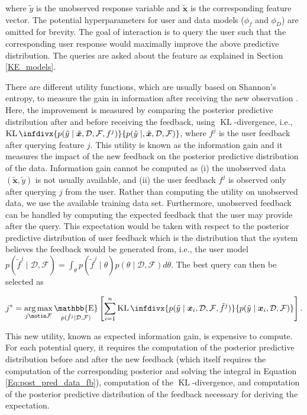 \documentclass[dissertation,math,vertlayout,pdfa,colorlinks]{aaltoseries}
\newcommand{\bD}{\mathcal{D}}
\newcommand{\bF}{\mathcal{F}}
\DeclareMathOperator{\KLt}{KL}
\newcommand{\KL}{\KLt\infdivx}
\DeclareMathOperator{\E}{\mathbb{E}}
\DeclareMathOperator*{\argmax}{arg\,max}
\begin{document}
\noindent where $\tilde{y}$ is the unobserved response variable and  $\tilde{\bm{x}}$ is the corresponding feature vector. %
The potential hyperparameters for user and data models ($\phi_f$ and $\phi_D$) are omitted for brevity. The goal of interaction is to query the user such that the corresponding user response would maximally improve the above predictive distribution. The queries are asked about the feature as explained in Section \ref{KE_models}. %


There are different utility functions, which are usually based on Shannon's entropy, to measure the gain in information after receiving the new observation \cite{MacKayOSD}. Here, the improvement is measured by comparing the posterior predictive distribution after and before receiving the feedback, using $\KLt$-divergence, i.e., $\KL{p(\tilde{y} \mid \tilde{\bm{x}}, \bD,\bF,f^{j})} {p(\tilde{y} \mid, \tilde{\bm{x}}, \bD,\bF)}$, where $f^{j}$ is the user feedback after querying feature $j$. This utility is known as the information gain and it measures the impact of the new feedback on the posterior predictive distribution of the data. Information gain cannot be computed as (i) the unobserved data $(\tilde{\bm{x}},\tilde{y})$ is not usually available, and (ii) the user feedback $f^{j}$ is observed only after querying $j$ from the user. Rather than computing the utility on unobserved data, we use the available training data set. Furthermore, unobserved feedback can be handled by computing the expected feedback that the user may provide after the query. This expectation would be taken with respect to the posterior predictive distribution of user feedback which is the distribution that the system believes the feedback would be generated from, i.e., the user model $p(\tilde{f}^j \mid \bD,\bF)= \int_{\theta} p(\tilde{f}^j \mid \theta)p(\theta \mid \bD, \bF)d\theta$. The best query can then be  selected as

\begin{equation}\label{Eq:expected_info_gain}
j^* = \argmax_{j \notin \bF} \E_{p(\tilde{f}^j \mid \bD,\bF)} \left[ \sum_{i=1}^{n}  \KL{p(\tilde{y}\mid \bm{x}_i, \bD,\bF,\tilde{f}^j)} {p(\tilde{y} \mid \bm{x}_i, \bD,\bF)} \right].
\end{equation}
    
This new utility, known as expected information gain, is expensive to compute. For each potential query, it requires the computation of the posterior predictive distribution before and after the new feedback (which itself requires the computation of the corresponding posterior and solving the integral in Equation \ref{Eq:post_pred_data_fb}), computation of the $\KLt$-divergence, and computation of the posterior predictive distribution of the feedback necessary for deriving the expectation. 
\end{document}
